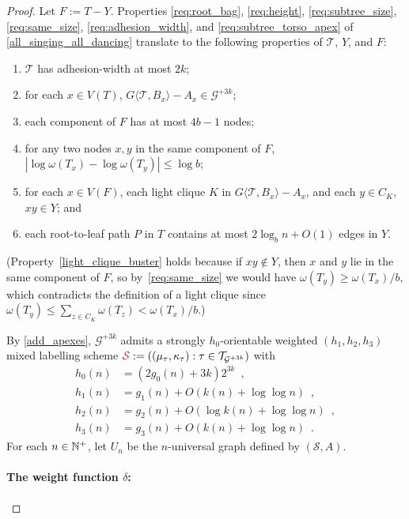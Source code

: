 \documentclass{patmorin}
\makeatletter
\renewcommand{\ge}{\geqslant}
\renewcommand{\le}{\leqslant}
\def\mathcolor#1#{\@mathcolor{#1}}
\def\@mathcolor#1#2#3{%
  \protect\leavevmode
  \begingroup
    \color#1{#2}#3%
  \endgroup
}
\newcommand{\mathdefin}[1]{\mathcolor{brightmaroon}{#1}}
\newcommand{\torso}[2]{{#1}\langle{#2}\rangle}
\newcommand{\Oh}{O}
\newcommand{\calG}{\mathcal{G}}
\newcommand{\calS}{\mathcal{S}}
\newcommand{\calT}{\mathcal{T}}
\makeatother
\begin{document}
\begin{proof}
  Let $F:=T-Y$.  Properties 
  \ref{req:root_bag}, 
  \ref{req:height}, 
  \ref{req:subtree_size}, 
  \ref{req:same_size}, 
  \ref{req:adhesion_width}, and
  \ref{req:subtree_torso_apex} 
  of \cref{all_singing_all_dancing} translate to the following properties of $\calT$, $Y$, and $F$:
  \begin{enumerate}[nosep,nolistsep,label=(P\arabic*)]
    \item\label{td_width} $\calT$ has adhesion-width at most $2k$;
    \item\label{torsos_in_G_plus_k} for each $x\in V(T)$, 
    $\torso{G}{\calT,B_x}-A_x\in \calG^{+3k}$;
    \item\label{component_size} each component of $F$ has at most $4b-1$ nodes;
    \item\label{no_fast_shrink} for any two nodes $x,y$ in the same component of $F$, $|\log\omega(T_x)-\log\omega(T_y)|\le\log b$;
    \item\label{light_clique_buster} for each $x\in V(F)$, each light clique $K$ in $\torso{G}{\calT,B_x}-A_x$, and each $y\in C_K$, $xy\in Y$; and
    \item\label{y_on_path} each root-to-leaf path $P$ in $T$ contains at most $2\log_b n +\Oh(1)$ edges in $Y$.
  \end{enumerate}
  (Property~\ref{light_clique_buster} holds because if $xy\notin Y$, then $x$ and $y$ lie in the same component of $F$, so by~\ref{req:same_size} we would have $\omega(T_y)\ge \omega(T_x)/b$, which contradicts the definition of a light clique since $\omega(T_y)\le \sum_{z\in C_K}\omega(T_z) < \omega(T_x)/b$.)

  By \cref{add_apexes}, $\calG^{+3k}$ admits a strongly $h_0$-orientable weighted $(h_1,h_2,h_3)$ mixed labelling scheme $\mathdefin{\calS}:=((\mu_\tau,\kappa_\tau):\tau\in\calT_{\calG^{+3k}})$ with 
  \begin{align}
    h_0(n) & = (2g_0(n) + 3k)2^{3k} \enspace , \nonumber \\
    h_1(n) & = g_1(n) + \Oh(k(n)+\log\log n) \enspace , \label{h1_td} \\ 
    h_2(n) & = g_2(n) + \Oh(\log k(n) + \log\log n) \enspace , \label{h2_td} \\ 
    h_3(n) & = g_3(n) + \Oh(k(n) + \log\log n) \enspace \label{h3_td} . 
  \end{align} 
  For each $n\in\mathbb{N}^+$, let $U_n$ be the $n$-universal graph defined by $(\calS,A)$. 

  
  
  \paragraph{\boldmath The weight function $\delta$:} 


\end{proof}
\end{document}
